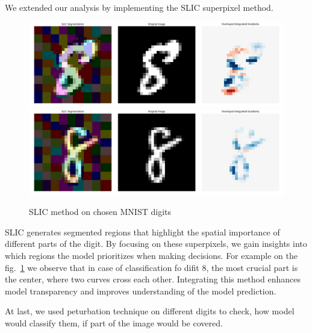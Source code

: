 \documentclass[journal, a4paper]{IEEEtran}
\begin{document}
We extended our analysis by implementing the SLIC superpixel method.

\begin{figure}[h]\centering
    \includegraphics[width=.6\linewidth]{img/SLIC/mnist/8}
    \includegraphics[width=.6\linewidth]{img/SLIC/mnist/8_1}
    \caption{SLIC method on chosen MNIST digits}\label{fig:mnist-cnn-slic}
\end{figure}

SLIC generates segmented regions that highlight the spatial importance of different parts of the digit.
By focusing on these superpixels, we gain insights into which regions the model prioritizes when making decisions.
For example on the fig.~\ref{fig:mnist-cnn-slic} we observe that in case of classification fo difit 8, the most crucial part is the center, where two curves cross each other.
Integrating this method enhances model transparency and improves understanding of the model prediction.

At last, we used peturbation technique on different digits to check, how model would classify them, if part of the image would be covered.
\end{document}
